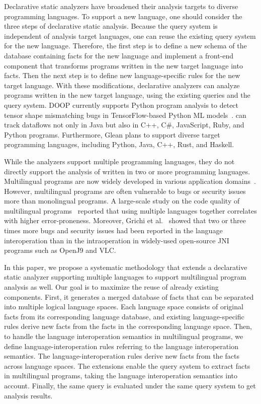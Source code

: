 Declarative static analyzers have broadened their analysis targets
to diverse programming languages. To support a new language, one should consider
the three steps of declarative static analysis. Because the query
system is independent of analysis target languages, one can reuse the
existing query system for the new language. Therefore, the first step
is to define a new schema of the database containing facts for the new
language and implement a
front-end component that transforms programs written in the new target language into facts.
Then the next step is to define new language-specific rules for the new target language.  With these
modifications, declarative analyzers can analyze programs written in the new
target language, using the existing queries and the query system.  DOOP currently
supports Python program analysis to detect tensor shape mismatching bugs in
TensorFlow-based Python ML models~\cite{lagouvardos2020static}.  can track dataflows not only
in Java but also in C++, C\#, JavaScript, Ruby, and Python programs.
Furthermore, Glean plans to support diverse target programming languages,
including Python, Java, C++, Rust, and Haskell.

While the analyzers support multiple programming languages, they do not directly
support the analysis of  written in two or more
programming languages. Multilingual programs are now widely developed in
various application domains~\cite{kochhar2016large, mergendahlcross}. However,
multilingual programs are often vulnerable to bugs or security issues more than
monolingual programs. A large-scale study on the code quality of multilingual
programs~\cite{kochhar2016large} reported that using multiple languages
together correlates with higher error-proneness. Moreover,
Grichi et al.~\cite{grichi2020impact} showed that two or three times more bugs and security
issues had been reported in the language interoperation than in the
intraoperation in widely-used open-source JNI programs such as OpenJ9 and VLC.

In this paper, we propose a systematic methodology that extends a
declarative static analyzer supporting multiple languages to support
multilingual program analysis as well. Our goal is to maximize the reuse of
already existing components. First, it generates a merged database of facts that can
be separated into multiple logical language spaces.  Each language space
consists of original facts from its corresponding language database, and existing
language-specific rules derive new facts from the facts in the corresponding
language space. Then, to handle the language interoperation semantics in
multilingual programs, we define language-interoperation rules referring to
the language interoperation semantics. The language-interoperation rules derive new
facts from the facts across language spaces. The extensions enable the query system
to extract facts in multilingual programs, taking the language
interoperation semantics into account.
Finally, the same query is evaluated under the same query system to get
analysis results.

